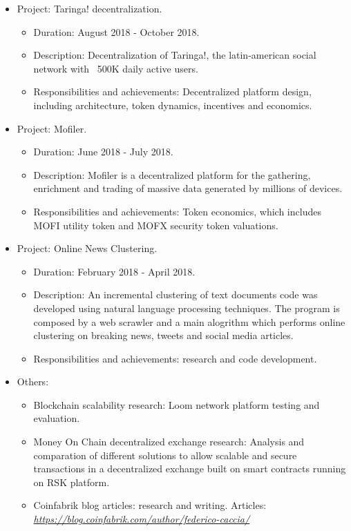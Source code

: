 \documentclass[11pt,a4paper,sans]{moderncv}        %
\begin{document}
{\begin{itemize}
\begin{itemize}
	\end{itemize}
\item Project: Taringa! decentralization.
	\begin{itemize}%
	\item Duration: August 2018 - October 2018.
	\item Description: Decentralization of Taringa!, the latin-american social network with ~500K daily active users.
	\item Responsibilities and achievements: Decentralized platform design, including architecture, token dynamics, incentives and economics.
	\end{itemize}
\item Project: Mofiler.
	\begin{itemize}%
	\item Duration: June 2018 - July 2018.
	\item Description: Mofiler is a decentralized platform for the gathering, enrichment and trading of
	massive data generated by millions of devices.
	\item Responsibilities and achievements: Token economics, which includes MOFI utility token and MOFX security token valuations.
	\end{itemize}
\item Project: Online News Clustering.
	\begin{itemize}%
	\item Duration: February 2018 - April 2018.
	\item Description: An incremental clustering of text documents code was developed using natural language processing techniques.
	The program is composed by a web scrawler and a main alogrithm which performs online clustering on breaking news,
	tweets and social media articles.
	\item Responsibilities and achievements: research and code development.
	\end{itemize}
\item Others:
	\begin{itemize}%
	\item Blockchain scalability research: Loom network platform testing and evaluation. 
	\item Money On Chain decentralized exchange research: Analysis and comparation of different solutions to allow scalable and secure transactions in a decentralized exchange built on smart contracts running on RSK platform.
	\item Coinfabrik blog articles: research and writing. \newline
	Articles: \href{https://blog.coinfabrik.com/author/federico-caccia/}{\textit{https://blog.coinfabrik.com/author/federico-caccia/}}
	\end{itemize}
\end{itemize}
}
\end{document}
